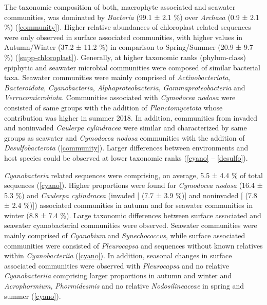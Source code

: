 \documentclass[12pt,]{article}
\begin{document}
The taxonomic composition of both, macrophyte associated and seawater
communities, was dominated by \emph{Bacteria} (99.1 ± 2.1 \si{\percent})
over \emph{Archaea} (0.9 ± 2.1 \si{\percent}) (\autoref{community}).
Higher relative abundances of chloroplast related sequences were only
observed in surface associated communities, with higher values in
Autumn/Winter (37.2 ± 11.2 \si{\percent}) in comparison to Spring/Summer
(20.9 ± 9.7 \si{\percent}) (\autoref{supp-chloroplast}). Generally, at
higher taxonomic ranks (phylum-class) epiphytic and seawater microbial
communities were composed of similar bacterial taxa. Seawater
communities were mainly comprised of \emph{Actinobacteriota},
\emph{Bacteroidota}, \emph{Cyanobacteria}, \emph{Alphaproteobacteria},
\emph{Gammaproteobacteria} and \emph{Verrucomicrobiota}. Communities
associated with \emph{Cymodocea nodosa} were consisted of same groups
with the addition of \emph{Planctomycetota} whose contribution was
higher in summer 2018. In addition, communities from invaded and
noninvaded \emph{Caulerpa cylindracea} were similar and characterized by
same groups as seawater and \emph{Cymodocea nodosa} communities with the
addition of \emph{Desulfobacterota} (\autoref{community}). Larger
differences between environments and host species could be observed at
lower taxonomic ranks (\autoref{cyano} -- \ref{desulfo}).

\emph{Cyanobacteria} related sequences were comprising, on average, 5.5
± 4.4 \si{\percent} of total sequences (\autoref{cyano}). Higher
proportions were found for \emph{Cymodocea nodosa} (16.4 ± 5.3
\si{\percent}) and \emph{Caulerpa cylindracea} (invaded {[} (7.7 ± 3.9
\si{\percent}){]} and noninvaded {[} (7.8 ± 2.4 \si{\percent}){]})
associated communities in autumn and for seawater communities in winter
(8.8 ± 7.4 \si{\percent}). Large taxonomic differences between surface
associated and seawater cyanobacterial communities were observed.
Seawater communities were mainly comprised of \emph{Cyanobium} and
\emph{Synechococcus}, while surface associated communities were
consisted of \emph{Pleurocapsa} and sequences without known relatives
within \emph{Cyanobacteriia} (\autoref{cyano}). In addition, seasonal
changes in surface associated communities were observed with
\emph{Pleurocapsa} and no relative \emph{Cyanobacteriia} comprising
larger proportions in autumn and winter and \emph{Acrophormium},
\emph{Phormidesmis} and no relative \emph{Nodosilineaceae} in spring and
summer (\autoref{cyano}).
\end{document}
